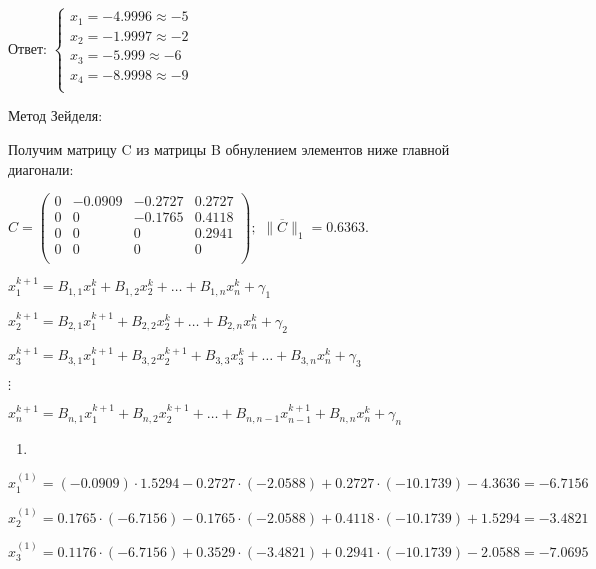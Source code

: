 \documentclass[10pt, a4paper]{scrartcl}
\begin{document}
Ответ:
\(\displaystyle \begin{cases} x_1 = -4.9996 \approx -5\\ x_2 = -1.9997 \approx -2\\ x_3 = -5.999 \approx -6\\ x_4 = -8.9998 \approx -9\\ \end{cases}\)

\vspace{5mm}

Метод Зейделя:

Получим матрицу C из матрицы B обнулением элементов ниже главной
диагонали:

\(\displaystyle C = \begin{pmatrix} 0 & -0.0909 & -0.2727 & 0.2727\\ 0 & 0 & -0.1765 & 0.4118\\ 0 & 0 & 0 & 0.2941\\ 0 & 0 & 0 & 0\\ \end{pmatrix};\)
\(\displaystyle \parallel \overline{C} \parallel _1 = 0.6363.\)

\(\displaystyle x_1^{k+1} = B_{1,1}x_1^{k} + B_{1,2}x_2^{k} + \dots + B_{1,n}x_{n}^{k} + \gamma_1\)

\(\displaystyle x_2^{k+1} = B_{2,1}x_1^{k+1} + B_{2,2}x_2^{k} + \dots + B_{2,n}x_{n}^{k} + \gamma_2\)

\(\displaystyle x_3^{k+1} = B_{3,1}x_1^{k+1} + B_{3,2}x_2^{k+1} + B_{3,3}x_{3}^{k} + \dots + B_{3,n}x_{n}^{k} + \gamma_3\)

\(\displaystyle \vdots\)

\(\displaystyle x_n^{k+1} = B_{n,1}x_1^{k+1} + B_{n,2}x_2^{k+1} + \dots + B_{n,n-1}x_{n-1}^{k+1} + B_{n,n}x_n^{k} + \gamma_n\)

\pagebreak

\begin{enumerate}
\def\labelenumi{\arabic{enumi})}
\item
\end{enumerate}

\(\displaystyle x_1^{(1)} = (-0.0909)\cdot1.5294 - 0.2727\cdot(-2.0588) + 0.2727\cdot(-10.1739) - 4.3636 = -6.7156\)

\(\displaystyle x_2^{(1)} = 0.1765\cdot(-6.7156) - 0.1765\cdot(-2.0588) + 0.4118\cdot(-10.1739) + 1.5294 = -3.4821\)

\(\displaystyle x_3^{(1)} = 0.1176\cdot(-6.7156) + 0.3529\cdot(-3.4821) + 0.2941\cdot(-10.1739) - 2.0588= -7.0695\)
\end{document}
